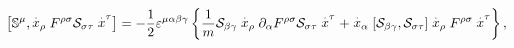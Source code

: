 \begin{equation}
\left[ \Bbb{S}^{\mu },\stackrel{.}{x}_{\rho }F^{\rho \sigma }\mathcal{S}%
_{\sigma \tau }\stackrel{.}{x}^{\tau }\right] =-\frac{1}{2}\varepsilon ^{\mu
\alpha \beta \gamma }\left\{ \frac{1}{m}\mathcal{S}_{\beta \gamma }\stackrel{%
.}{x}_{\rho }\partial _{\alpha }F^{\rho \sigma }\mathcal{S}_{\sigma \tau }%
\stackrel{.}{x}^{\tau }+\stackrel{.}{x}_{\alpha }\left[ \mathcal{S}_{\beta
\gamma },\mathcal{S}_{\sigma \tau }\right] \stackrel{.}{x}_{\rho }F^{\rho
\sigma }\stackrel{.}{x}^{\tau }\right\} ,
\end{equation}

